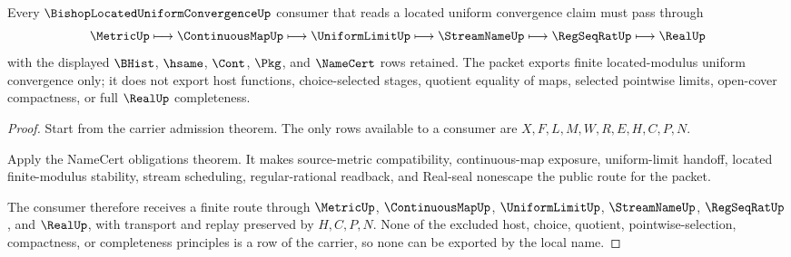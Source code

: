 \begin{theorem}
\label{thm:bishop-located-uniform-convergence-nonescape}
Every $\BishopLocatedUniformConvergenceUp$ consumer that reads a located uniform convergence claim must pass through
$$
\MetricUp \longmapsto \ContinuousMapUp \longmapsto \UniformLimitUp \longmapsto \StreamNameUp \longmapsto \RegSeqRatUp \longmapsto \RealUp
$$
with the displayed $\BHist$, $\hsame$, $\Cont$, $\Pkg$, and $\NameCert$ rows retained. The packet exports finite located-modulus uniform convergence only; it does not export host functions, choice-selected stages, quotient equality of maps, selected pointwise limits, open-cover compactness, or full $\RealUp$ completeness.
\end{theorem}
\begin{proof}
Start from the carrier admission theorem. The only rows available to a consumer are $X,F,L,M,W,R,E,H,C,P,N$.

Apply the NameCert obligations theorem. It makes source-metric compatibility, continuous-map exposure, uniform-limit handoff, located finite-modulus stability, stream scheduling, regular-rational readback, and Real-seal nonescape the public route for the packet.

The consumer therefore receives a finite route through $\MetricUp$, $\ContinuousMapUp$, $\UniformLimitUp$, $\StreamNameUp$, $\RegSeqRatUp$, and $\RealUp$, with transport and replay preserved by $H,C,P,N$. None of the excluded host, choice, quotient, pointwise-selection, compactness, or completeness principles is a row of the carrier, so none can be exported by the local name.
\end{proof}



